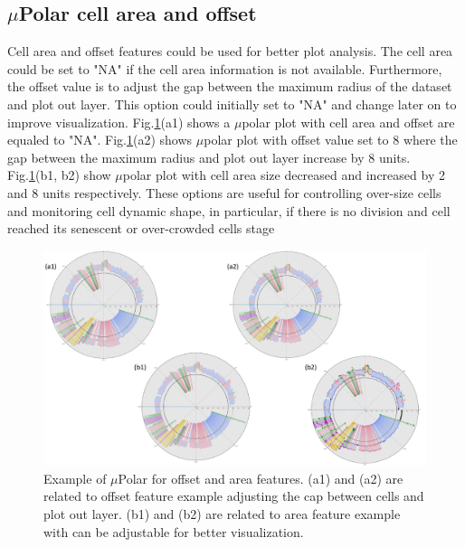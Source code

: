 \documentclass[conference]{IEEEtran}
\begin{document}
\subsection{$\mu$Polar cell area and offset}

Cell area and offset features could be used for better plot analysis. The cell area could be set to "NA" if the cell area information is not available. Furthermore, the offset value is to adjust the gap between the maximum radius of the dataset and plot out layer. This option could initially set to "NA" and change later on to improve visualization. Fig.\ref{fig:areaoff}(a1) shows a $\mu$polar plot with cell area and offset are equaled to "NA". Fig.\ref{fig:areaoff}(a2) shows $\mu$polar plot with offset value set to 8 where the gap between the maximum radius and plot out layer increase by 8 units. Fig.\ref{fig:areaoff}(b1, b2) show $\mu$polar plot with cell area size decreased and increased by 2 and 8 units respectively. These options are useful for controlling over-size cells and monitoring cell dynamic shape, in particular, if there is no division and cell reached its senescent or over-crowded cells stage    

\begin{figure}
\centering
\includegraphics[width=\textwidth,height=10 cm]{Patterns/area_offset.pdf}
\caption{ Example of $\mu$Polar for offset and area features. (a1) and (a2) are related to offset feature example adjusting the cap between cells and plot out layer. (b1) and (b2) are related to area feature example with can be adjustable for better visualization.}
\label{fig:areaoff}
\end{figure}
\end{document}
